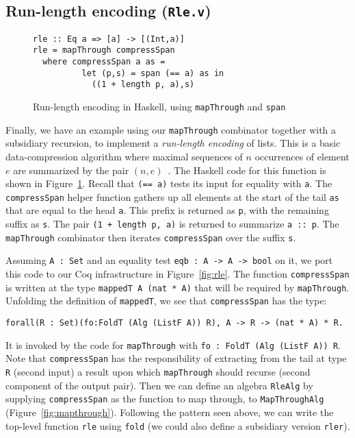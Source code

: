\documentclass[a4paper,USenglish]{lipics-v2021}
\begin{document}
\subsection{Run-length encoding (\texttt{Rle.v})}

\begin{figure}
\begin{verbatim}
rle :: Eq a => [a] -> [(Int,a)]
rle = mapThrough compressSpan
  where compressSpan a as =
          let (p,s) = span (== a) as in
            ((1 + length p, a),s)
\end{verbatim}
\caption{Run-length encoding in Haskell, using \texttt{mapThrough} and \texttt{span}}
\label{fig:rlehs}
\end{figure}

Finally, we have an example using our \verb|mapThrough| combinator
together with a subsidiary recursion, to implement a \emph{run-length
encoding} of lists.  This is a basic data-compression algorithm where maximal
sequences of $n$ occurrences of element $e$ are summarized by the pair
$(n,e)$~\cite{datacomp}.  The Haskell code for this function is shown in Figure~\ref{fig:rlehs}.
Recall that \verb|(== a)| tests its input for equality with \verb|a|.
The \verb|compressSpan| helper function gathers up all elements at the
start of the tail \verb|as| that are equal to the head \verb|a|.  This
prefix is returned as \verb|p|, with the remaining suffix as \verb|s|.
The pair \verb|(1 + length p, a)| is returned to summarize
\verb|a :: p|.  The \verb|mapThrough| combinator then iterates
\verb|compressSpan| over the suffix \verb|s|.

Assuming \verb|A : Set| and an equality test \verb|eqb : A -> A -> bool| on it,
we port this code to our Coq infrastructure in Figure~\ref{fig:rle}.
The function \verb|compressSpan| is written at the type \verb|mappedT A (nat * A)| that
will be required by \verb|mapThrough|.  Unfolding the definition of \verb|mappedT|,
we see that \verb|compressSpan| has the type:
\begin{verbatim}
forall(R : Set)(fo:FoldT (Alg (ListF A)) R), A -> R -> (nat * A) * R.
\end{verbatim}
\noindent It is invoked by the code for \verb|mapThrough| with
\verb|fo : FoldT (Alg (ListF A)) R|.  Note that \verb|compressSpan|
has the responsibility of extracting from the tail at type \verb|R|
(second input) a result upon which \verb|mapThrough| should recurse
(second component of the output pair). Then we can define an algebra
\verb|RleAlg| by supplying \verb|compressSpan| as the function to map
through, to \verb|MapThroughAlg| (Figure~\ref{fig:mapthrough}).
Following the pattern seen above, we can write the top-level function
\verb|rle| using \verb|fold| (we could also define a subsidiary
version \verb|rler|).
\end{document}
